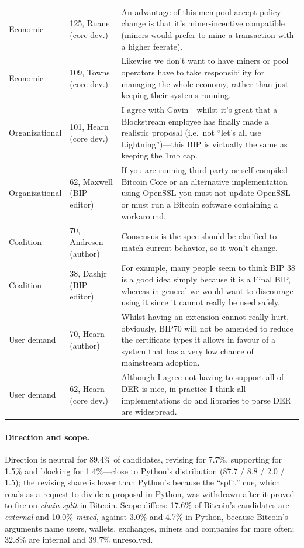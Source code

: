 \documentclass[sigconf,screen]{acmart}
\begin{document}
\begin{table}[t]
\begin{tabular}{p{}p{}p{}}
Economic & 125, Ruane (core dev.) & An advantage of this mempool-accept policy change is that it's miner-incentive compatible (miners would prefer to mine a transaction with a higher feerate). \\
Economic & 109, Towns (core dev.) & Likewise we don't want to have miners or pool operators have to take responsibility for managing the whole economy, rather than just keeping their systems running. \\
Organizational & 101, Hearn (core dev.) & I agree with Gavin---whilst it's great that a Blockstream employee has finally made a realistic proposal (i.e.\ not ``let's all use Lightning'')---this BIP is virtually the same as keeping the 1mb cap. \\
Organizational & 62, Maxwell (BIP editor) & If you are running third-party or self-compiled Bitcoin Core or an alternative implementation using OpenSSL you must not update OpenSSL or must run a Bitcoin software containing a workaround. \\
Coalition & 70, Andresen (author) & Consensus is the spec should be clarified to match current behavior, so it won't change. \\
Coalition & 38, Dashjr (BIP editor) & For example, many people seem to think BIP 38 is a good idea simply because it is a Final BIP, whereas in general we would want to discourage using it since it cannot really be used safely. \\
User demand & 70, Hearn (author) & Whilst having an extension cannot really hurt, obviously, BIP70 will not be amended to reduce the certificate types it allows in favour of a system that has a very low chance of mainstream adoption. \\
User demand & 62, Hearn (core dev.) & Although I agree not having to support all of DER is nice, in practice I think all implementations do and libraries to parse DER are widespread. \\
\bottomrule
\end{tabular}
\end{table}

\paragraph{Direction and scope.} Direction is neutral for 89.4\% of candidates, revising for 7.7\%, supporting for 1.5\% and blocking for 1.4\%---close to Python's distribution (87.7 / 8.8 / 2.0 / 1.5); the revising share is lower than Python's because the ``split'' cue, which reads as a request to divide a proposal in Python, was withdrawn after it proved to fire on \emph{chain split} in Bitcoin. Scope differs: 17.6\% of Bitcoin's candidates are \emph{external} and 10.0\% \emph{mixed}, against 3.0\% and 4.7\% in Python, because Bitcoin's arguments name users, wallets, exchanges, miners and companies far more often; 32.8\% are internal and 39.7\% unresolved.
\end{document}

